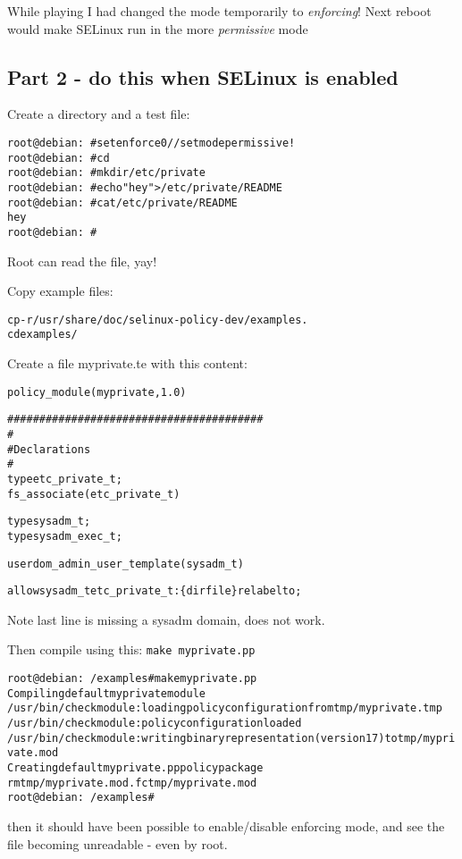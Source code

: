 \documentclass[a4paper,11pt,notitlepage]{report}
\begin{document}
While playing I had changed the mode temporarily to \emph{enforcing}! Next reboot would make SELinux run in the more \emph{permissive} mode

\subsection{Part 2 - do this when SELinux is enabled}

Create a directory and a test file:
\begin{alltt}
root@debian:~# setenforce 0   // set mode permissive!
root@debian:~# cd
root@debian:~# mkdir /etc/private
root@debian:~# echo "hey" > /etc/private/README
root@debian:~# cat /etc/private/README
hey
root@debian:~#
\end{alltt}

Root can read the file, yay!

Copy example files:
\begin{alltt}
cp -r /usr/share/doc/selinux-policy-dev/examples .
cd examples/

\end{alltt}

\eject

Create a file myprivate.te with this content:
\begin{alltt}
policy_module(myprivate, 1.0)

########################################
#
# Declarations
#
type etc_private_t;
fs_associate(etc_private_t)

type sysadm_t;
type sysadm_exec_t;

userdom_admin_user_template(sysadm_t)

allow sysadm_t etc_private_t:\{dir file\} relabelto;
\end{alltt}

Note last line is missing a sysadm domain, does not work.

Then compile using this: \verb+make myprivate.pp+
\begin{alltt}
root@debian:~/examples# make myprivate.pp
Compiling default myprivate module
/usr/bin/checkmodule:  loading policy configuration from tmp/myprivate.tmp
/usr/bin/checkmodule:  policy configuration loaded
/usr/bin/checkmodule:  writing binary representation (version 17) to tmp/myprivate.mod
Creating default myprivate.pp policy package
rm tmp/myprivate.mod.fc tmp/myprivate.mod
root@debian:~/examples#
\end{alltt}

then it should have been possible to enable/disable enforcing mode, and see the file becoming unreadable - even by root.
\end{document}
